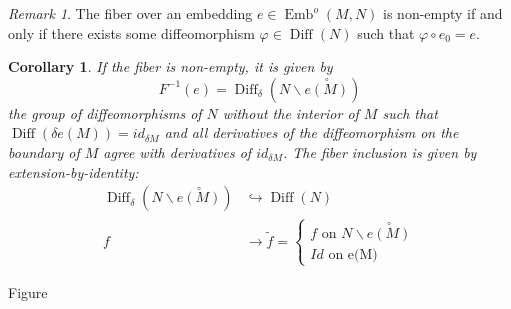 \documentclass{amsart}
\DeclareMathOperator{\Emb}{Emb}
\DeclareMathOperator{\Diff}{Diff}
\newtheorem{corollary}[theorem]{Corollary}
\theoremstyle{definition}
\theoremstyle{remark}
\newtheorem{remark}[theorem]{Remark}
\theoremstyle{example}
\begin{document}
\begin{remark}
    The fiber over an embedding $e \in \Emb^o(M,N)$ is non-empty if and only if there exists some diffeomorphism $\varphi \in \Diff(N)$ such that $\varphi \circ e_0 = e$.
\end{remark}

\begin{corollary}
    If the fiber is non-empty, it is given by 
    \[
    F^{-1}(e) = \Diff_{\delta}(N \backslash \overset{\circ}{e(M)})
    \]
    the group of diffeomorphisms of $N$ without the interior of $M$ such that $\Diff(\delta e(M)) = id_{\delta M}$ and all derivatives of the diffeomorphism on the boundary of $M$ agree with derivatives of $id_{\delta M}$. The fiber inclusion is given by extension-by-identity:
    \[
    \begin{aligned}
        \Diff_{\delta}(N \backslash \overset{\circ}{e(M)}) &\hookrightarrow \Diff(N) \\
        f &\to \widetilde{f} = \begin{cases}
            f \text{ on } N \backslash \overset{\circ}{e(M)}\\
            Id \text{ on e(M)}
        \end{cases}
    \end{aligned}
    \]
\end{corollary}

\begin{center}
\par\smallskip
{}\label{fig:extension-by-identity}
Figure~\thefigure
\end{center}
\end{document}
